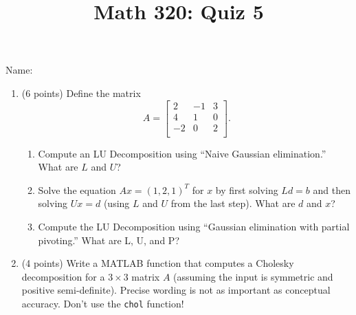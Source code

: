 \documentclass[12pt]{amsart}
\begin{document}
\flushright
Name:\underline{\hspace{5cm}}
\title{Math 320: Quiz 5}
\maketitle

\begin{enumerate}

\item (6 points) Define the matrix
\[A = \left[
\begin{array}{ccc}
2 & -1 & 3 \\
4 & 1 & 0 \\
-2 & 0 & 2 \\
\end{array} \right].
\] \begin{enumerate}
\item Compute an LU Decomposition using ``Naive Gaussian elimination.''
What are $L$ and $U$?
\item Solve the equation $Ax = (1,2,1)^T$ for $x$ by first solving
$Ld = b$ and then solving $Ux = d$ (using $L$ and $U$ from the last step). 
What are $d$ and $x$?

\vfill
\pagebreak

\item Compute the LU Decomposition using ``Gaussian elimination with partial
pivoting.'' What are L, U, and P?
\end{enumerate}

\pagebreak
\item (4 points) Write a MATLAB function that computes a Cholesky
decomposition for a $3 \times 3$ matrix $A$ (assuming the input
is symmetric and positive semi-definite). Precise wording is 
not as important as conceptual accuracy. Don't use the {\tt chol}
function!
\end{enumerate}
\end{document}
